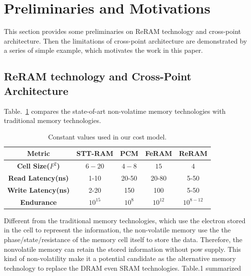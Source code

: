 \vspace{10pt}
\section{Preliminaries and Motivations}

This section provides some preliminaries on ReRAM technology and cross-point architecture. Then the limitations of cross-point architecture are demonstrated by a series of simple example, which motivates the work in this paper.

\subsection{ReRAM technology and Cross-Point Architecture}
Table.~\ref{table:compare} compares the state-of-art non-volatime memory technologies with traditional memory technologies.
\begin{table}
  \centering
  \scriptsize
    \scriptsize
  \caption{Constant values used in our cost model.}\label{table:compare}
  \vspace{-5pt}
  \begin{tabular}{|c|cccc|}
    \hline
    \textbf{Metric} & \textbf{STT-RAM} & \textbf{PCM}    & \textbf{FeRAM} & \textbf{ReRAM}
    \\\hline
    \textbf{Cell Size($F^2$)} & $6-20$ & $4-8$ & $15$ & $4$\\\hline
    \textbf{Read Latency(ns)} &  1-10 & 20-50 & 20-80 & 5-50\\\hline
    \textbf{Write Latency(ns)} & 2-20& 150& 100& 5-50\\\hline
    \textbf{Endurance} &  $10^{15}$ & $10^8$ & $10^{12}$ & $10^{8-12}$\\\hline
  \end{tabular}
  \vspace{-10pt}
\end{table}

Different from the traditional memory technologies, which use the electron stored in the cell to represent the information, the non-volatile memory use the the phase/state/resistance of the memory cell itself to store the data. Therefore, the nonvolatile memory can retain the stored information without pow supply. This kind of non-volatility make it a potential candidate as the alternative memory technology to replace the DRAM even SRAM technologies. Table.1 summarized


